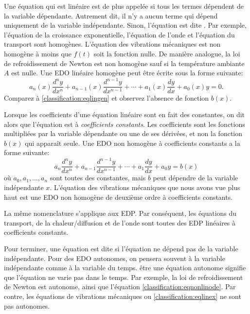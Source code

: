 Une équation qui est linéaire est de plus appelée \emph{} si tous les termes dépendent de la variable dépendante.  Autrement dit, il n'y a aucun terme qui dépend uniquement de la variable indépendante.  Sinon, l'équation est dite \emph{}.  Par exemple, l'équation de la croissance exponentielle, l'équation de l'onde et l'équation du transport sont homogènes.  L'équation des vibrations mécaniques est non homogène à moins que $f(t)$ soit la fonction nulle.  De manière analogue, la loi de refroidissement de Newton est non homogène sauf si la température ambiante $A$ est nulle.
Une EDO linéaire homogène peut être écrite sous la forme suivante: 
\begin{equation*}
a_n(x) \frac{d^n y}{dx^n} + 
a_{n-1}(x) \frac{d^{n-1} y}{dx^{n-1}} + 
\cdots
+
a_{1}(x) \frac{dy}{dx}
+
a_{0}(x) y = 0 .
\end{equation*}
Comparez à \eqref{classification:eqlingen} et observez l'absence de fonction $b(x)$.

\medskip

Lorsque les coefficients d'une équation linéaire sont en fait des constantes, on dit alors que l'équation est à 
\emph{coefficients constants}.
Les coefficients sont les fonctions multipliées par la variable dépendante ou une de ses dérivées, et non la fonction $b(x)$ qui appara\^it seule.
Une EDO non homogène à coefficients constants a la forme suivante: 
\begin{equation*}
	a_n \frac{d^n y}{dx^n} 
		+ a_{n-1} \frac{d^{n-1} y}{dx^{n-1}} 
		+ \cdots
		+ a_{1} \frac{dy}{dx}
		+ a_{0} y 
		= b(x) 
\end{equation*}
où $a_0, a_1, \ldots, a_n$ sont toutes des constantes, mais 
$b$ peut dépendre de la variable indépendante $x$.
L'équation des vibrations mécaniques que nous avons vue plus haut est une EDO non homogène de deuxième ordre à coefficients constants.  

La même nomenclature s'applique aux EDP.  Par conséquent, les équations du transport, de la chaleur/diffusion et de l'onde sont toutes des EDP linéaires à coefficients constants.

\medskip

Pour terminer, une équation est dite \emph{}
 si l'équation ne dépend pas de la variable indépendante.  Pour des EDO autonomes, on pensera souvent à la variable indépendante comme à la variable du temps.  être une équation autonome signifie que l'équation ne varie pas dans le temps.  Par exemple, la loi de refroidissement de Newton est autonome, ainsi que l'équation \eqref{classification:eqnonlinode}.  Par contre, les équations de vibrations mécaniques ou \eqref{classification:eqlinex} ne sont pas autonomes.

